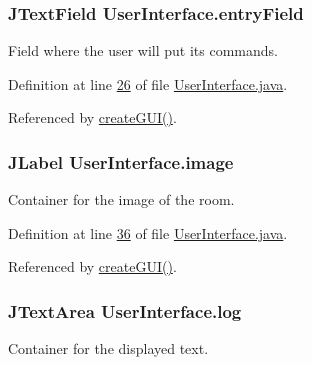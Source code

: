 \hypertarget{classUserInterface_a940367d996e9e7ad6e1fa1abfe35128b}{
\subsubsection[{entry\-Field}]{\setlength{\rightskip}{0pt plus 5cm}J\-Text\-Field User\-Interface.\-entry\-Field\hspace{0.3cm}{\ttfamily [private]}}}\label{classUserInterface_a940367d996e9e7ad6e1fa1abfe35128b}
Field where the user will put its commands. 

Definition at line \hyperlink{UserInterface_8java_source_l00026}{26} of file \hyperlink{UserInterface_8java_source}{User\-Interface.\-java}.



Referenced by \hyperlink{UserInterface_8java_source_l00092}{create\-G\-U\-I()}.

\hypertarget{classUserInterface_a0d115eb19b54f3e002ec6aa0fcfb1db4}{
\subsubsection[{image}]{\setlength{\rightskip}{0pt plus 5cm}J\-Label User\-Interface.\-image\hspace{0.3cm}{\ttfamily [private]}}}\label{classUserInterface_a0d115eb19b54f3e002ec6aa0fcfb1db4}
Container for the image of the room. 

Definition at line \hyperlink{UserInterface_8java_source_l00036}{36} of file \hyperlink{UserInterface_8java_source}{User\-Interface.\-java}.



Referenced by \hyperlink{UserInterface_8java_source_l00092}{create\-G\-U\-I()}.

\hypertarget{classUserInterface_a7f6ed10812f99e2cc6ce5f497d8ba2a0}{
\subsubsection[{log}]{\setlength{\rightskip}{0pt plus 5cm}J\-Text\-Area User\-Interface.\-log\hspace{0.3cm}{\ttfamily [private]}}}\label{classUserInterface_a7f6ed10812f99e2cc6ce5f497d8ba2a0}
Container for the displayed text. 

